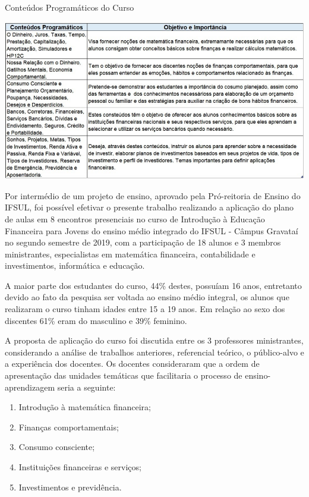 \graphicspath{{quadros/}}
\begin{quadro}[!ht]
\centering
\begin{minipage}{1.\textwidth}
\caption{Conteúdos Programáticos do Curso}
\centering
\includegraphics[width=1.0\textwidth]{quadro-05-conteudo-programatico.png}
\label{quad: quadro-05-conteudo-programatico}
\end{minipage}
\end{quadro}

Por intermédio de um projeto de ensino, aprovado pela Pró-reitoria de Ensino do IFSUL, foi possível efetivar o presente trabalho realizando a aplicação do plano de aulas em 8 encontros presenciais no curso de Introdução à Educação Financeira para Jovens do ensino médio integrado do IFSUL - Câmpus Gravataí no segundo semestre de 2019, com a participação de 18 alunos e 3 membros ministrantes, especialistas em matemática financeira, contabilidade e investimentos, informática e educação.

A maior parte dos estudantes do curso, 44{\%} destes, possuíam 16 anos, entretanto devido ao fato da pesquisa ser voltada ao ensino médio integral, os alunos que realizaram o curso tinham idades entre 15 a 19 anos. Em relação ao sexo dos discentes 61{\%} eram do masculino e 39{\%} feminino.

A proposta de aplicação do curso foi discutida entre os 3 professores ministrantes, considerando a análise de trabalhos anteriores, referencial teórico, o público-alvo e a experiência dos docentes. Os docentes consideraram que a ordem de apresentação das unidades temáticas que facilitaria o processo de ensino-aprendizagem seria a seguinte:

\begin{enumerate}
    \item Introdução à matemática financeira;
    \item Finanças comportamentais;
    \item Consumo consciente;
    \item Instituições financeiras e serviços;
    \item Investimentos e previdência.
\end{enumerate}

